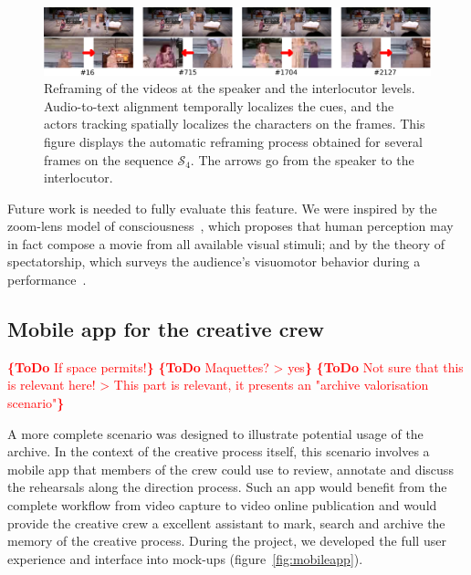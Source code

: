 \documentclass[conference]{IEEEtran}
\newcommand{\todo}[1]{\noindent\textcolor{red}{{\bf \{ToDo} #1{\bf \}}}}
\begin{document}
\begin{figure}[tp]
\centering
\includegraphics[width=\textwidth]{speakers2}
\caption{Reframing of the videos at the speaker and the interlocutor levels. Audio-to-text alignment temporally localizes the cues, and the actors tracking spatially localizes the characters on the frames. 
This figure displays the automatic reframing process obtained for several frames on the sequence $\mathcal{S}_4$. The arrows go from the speaker to the interlocutor.}
\label{fig_speaker}
\end{figure}


Future work is needed to fully evaluate this feature. We were inspired by the zoom-lens model of consciousness~\cite{Eriksen86}, 
which proposes  that human perception  may in fact compose a movie from all available visual  stimuli; and by the theory 
of spectatorship, which surveys the audience's visuomotor behavior  during a performance~\cite{Bennett97}.   

\subsection{Mobile app for the creative crew} 

\todo{If space permits!}
\todo{Maquettes? > yes}
\todo{Not sure that this is relevant here! > This part is relevant, it presents an "archive valorisation scenario"}

A more complete scenario was designed to illustrate potential usage of the archive. In the context of the creative process itself, this scenario involves a mobile app that members of the crew could use to review, annotate and discuss the rehearsals along the direction process. Such an app would benefit from the complete workflow from video capture to video online publication and would provide the creative crew a excellent assistant to mark, search and archive the memory of the creative process. During the project, we developed the full user experience and interface into mock-ups (figure~\ref{fig:mobileapp}).
\end{document}
